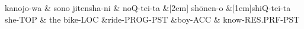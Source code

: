 \documentclass{standalone}
\begin{document}
 


\begin{dependency}[theme = simple, arc edge, arc angle=70, text only label, label style={above, font = \footnotesize} ]
\begin{deptext}[column sep=.1ex, row sep = .15ex]
	kanojo-wa \&  sono jitensha-ni \& noQ-tei-ta \&[2em] sh\={o}nen-o  \&[1em]shiQ-tei-ta \\
	she-TOP           \& the bike-LOC	\&ride-PROG-PST	\&boy-ACC  \& know-RES.PRF-PST\\
\end{deptext}
\end{dependency}
\end{document}
